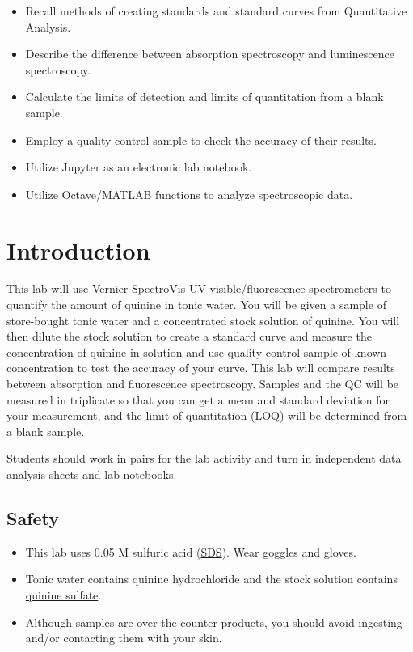 \documentclass[]{tufte-book}
\providecommand{\tightlist}{%
  \setlength{\itemsep}{0pt}\setlength{\parskip}{0pt}}
\begin{document}
\begin{itemize}
\tightlist
\item
  Recall methods of creating standards and standard curves from Quantitative Analysis.\\
\item
  Describe the difference between absorption spectroscopy and luminescence spectroscopy.
\item
  Calculate the limits of detection and limits of quantitation from a blank sample.
\item
  Employ a quality control sample to check the accuracy of their results.
\item
  Utilize Jupyter as an electronic lab notebook.
\item
  Utilize Octave/MATLAB functions to analyze spectroscopic data.
\end{itemize}

\hypertarget{uv-vis-intro}{%
\section*{Introduction}\label{uv-vis-intro}}

This lab will use Vernier SpectroVis UV-visible/fluorescence spectrometers to quantify the amount of quinine in tonic water. You will be given a sample of store-bought tonic water and a concentrated stock solution of quinine. You will then dilute the stock solution to create a standard curve and measure the concentration of quinine in solution and use quality-control sample of known concentration to test the accuracy of your curve. This lab will compare results between absorption and fluorescence spectroscopy. Samples and the QC will be measured in triplicate so that you can get a mean and standard deviation for your measurement, and the limit of quantitation (LOQ) will be determined from a blank sample.

Students should work in pairs for the lab activity and turn in independent data analysis sheets and lab notebooks.

\hypertarget{safety}{%
\subsection*{Safety}\label{safety}}

\begin{itemize}
\tightlist
\item
  This lab uses 0.05 M sulfuric acid (\href{https://beta-static.fishersci.com/content/dam/fishersci/en_US/documents/programs/education/regulatory-documents/sds/chemicals/chemicals-s/S25895.pdf}{SDS}). Wear goggles and gloves.
\item
  Tonic water contains quinine hydrochloride and the stock solution contains \href{https://beta-static.fishersci.com/content/dam/fishersci/en_US/documents/programs/education/regulatory-documents/sds/chemicals/chemicals-q/S25510A.pdf}{quinine sulfate}.
\item
  Although samples are over-the-counter products, you should avoid ingesting and/or contacting them with your skin.
\end{itemize}
\end{document}
